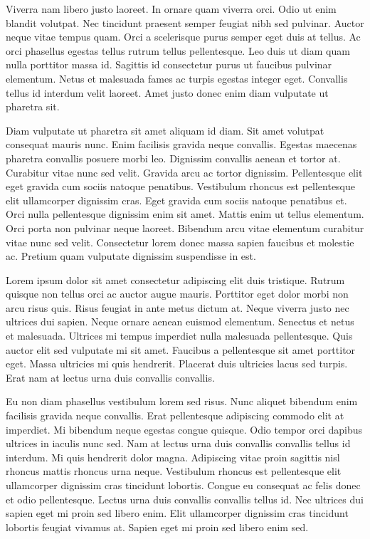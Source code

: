 \documentclass[11pt,a4paper]{article}
\begin{document}
Viverra nam libero justo laoreet. In ornare quam viverra orci. Odio ut enim blandit volutpat. Nec tincidunt praesent semper feugiat nibh sed pulvinar. Auctor neque vitae tempus quam. Orci a scelerisque purus semper eget duis at tellus. Ac orci phasellus egestas tellus rutrum tellus pellentesque. Leo duis ut diam quam nulla porttitor massa id. Sagittis id consectetur purus ut faucibus pulvinar elementum. Netus et malesuada fames ac turpis egestas integer eget. Convallis tellus id interdum velit laoreet. Amet justo donec enim diam vulputate ut pharetra sit.

Diam vulputate ut pharetra sit amet aliquam id diam. Sit amet volutpat consequat mauris nunc. Enim facilisis gravida neque convallis. Egestas maecenas pharetra convallis posuere morbi leo. Dignissim convallis aenean et tortor at. Curabitur vitae nunc sed velit. Gravida arcu ac tortor dignissim. Pellentesque elit eget gravida cum sociis natoque penatibus. Vestibulum rhoncus est pellentesque elit ullamcorper dignissim cras. Eget gravida cum sociis natoque penatibus et. Orci nulla pellentesque dignissim enim sit amet. Mattis enim ut tellus elementum. Orci porta non pulvinar neque laoreet. Bibendum arcu vitae elementum curabitur vitae nunc sed velit. Consectetur lorem donec massa sapien faucibus et molestie ac. Pretium quam vulputate dignissim suspendisse in est.

Lorem ipsum dolor sit amet consectetur adipiscing elit duis tristique. Rutrum quisque non tellus orci ac auctor augue mauris. Porttitor eget dolor morbi non arcu risus quis. Risus feugiat in ante metus dictum at. Neque viverra justo nec ultrices dui sapien. Neque ornare aenean euismod elementum. Senectus et netus et malesuada. Ultrices mi tempus imperdiet nulla malesuada pellentesque. Quis auctor elit sed vulputate mi sit amet. Faucibus a pellentesque sit amet porttitor eget. Massa ultricies mi quis hendrerit. Placerat duis ultricies lacus sed turpis. Erat nam at lectus urna duis convallis convallis.

Eu non diam phasellus vestibulum lorem sed risus. Nunc aliquet bibendum enim facilisis gravida neque convallis. Erat pellentesque adipiscing commodo elit at imperdiet. Mi bibendum neque egestas congue quisque. Odio tempor orci dapibus ultrices in iaculis nunc sed. Nam at lectus urna duis convallis convallis tellus id interdum. Mi quis hendrerit dolor magna. Adipiscing vitae proin sagittis nisl rhoncus mattis rhoncus urna neque. Vestibulum rhoncus est pellentesque elit ullamcorper dignissim cras tincidunt lobortis. Congue eu consequat ac felis donec et odio pellentesque. Lectus urna duis convallis convallis tellus id. Nec ultrices dui sapien eget mi proin sed libero enim. Elit ullamcorper dignissim cras tincidunt lobortis feugiat vivamus at. Sapien eget mi proin sed libero enim sed.
\end{document}
